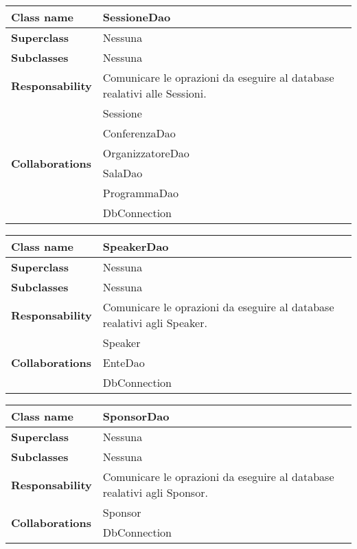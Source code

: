 \begin{table}[h!]
	\begin{tabular}{|l|l|}
		\hline 
		\textbf{Class name} & SessioneDao
		\\ \hline
		\textbf{Superclass} & Nessuna
		\\ \hline
		\multirow{1}{*}{\textbf{Subclasses}} & Nessuna
		\\ \hline
		\textbf{Responsability} & Comunicare le oprazioni da eseguire al database realativi alle Sessioni.
		\\ \hline
		\multirow{6}{*}{\textbf{Collaborations}} & Sessione \\ 
		& ConferenzaDao \\
		& OrganizzatoreDao \\
		& SalaDao \\
		& ProgrammaDao \\
		& DbConnection \\ \hline
	\end{tabular}
\end{table}
\newpage

\begin{table}[h!]
	\begin{tabular}{|l|l|}
		\hline 
		\textbf{Class name} & SpeakerDao
		\\ \hline
		\textbf{Superclass} & Nessuna
		\\ \hline
		\multirow{1}{*}{\textbf{Subclasses}} & Nessuna
		\\ \hline
		\textbf{Responsability} & Comunicare le oprazioni da eseguire al database realativi agli Speaker.
		\\ \hline
		\multirow{3}{*}{\textbf{Collaborations}} & Speaker \\ 
		& EnteDao \\
		& DbConnection \\ \hline
	\end{tabular}
\end{table}

\begin{table}[h!]
	\begin{tabular}{|l|l|}
		\hline 
		\textbf{Class name} & SponsorDao
		\\ \hline
		\textbf{Superclass} & Nessuna
		\\ \hline
		\multirow{1}{*}{\textbf{Subclasses}} & Nessuna
		\\ \hline
		\textbf{Responsability} & Comunicare le oprazioni da eseguire al database realativi agli Sponsor.
		\\ \hline
		\multirow{2}{*}{\textbf{Collaborations}} & Sponsor \\ 
		& DbConnection \\ \hline
	\end{tabular}
\end{table}

